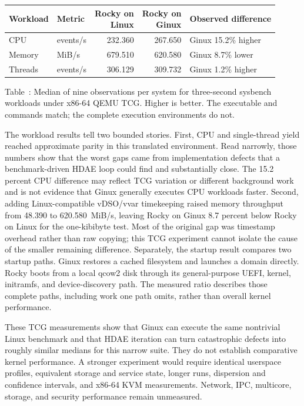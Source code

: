 \documentclass[11pt]{article}
\begin{document}
\begin{center}
\label{tab:sysbench-checkpoint}
\centering
\small
\begin{tabular}{@{}llrrl@{}}
\toprule
Workload & Metric & \shortstack{Rocky on\\Linux} & \shortstack{Rocky on\\Ginux} & Observed difference \\
\midrule
CPU & events/s & 232.360 & 267.650 & Ginux 15.2\% higher \\
Memory & MiB/s & 679.510 & 620.580 & Ginux 8.7\% lower \\
Threads & events/s & 306.129 & 309.732 & Ginux 1.2\% higher \\
\bottomrule
\end{tabular}
\par\medskip
Table~\thetable: Median of nine observations per system for three-second
sysbench workloads under x86-64 QEMU TCG. Higher is better. The executable and
commands match; the complete execution environments do not.
\end{center}
\medskip

The workload results tell two bounded stories. First, CPU and single-thread
yield reached approximate parity in this translated environment. Read narrowly,
those numbers show that the worst gaps came from implementation defects that a
benchmark-driven HDAE loop could find and substantially close. The 15.2 percent
CPU difference may reflect TCG variation or different background work and is
not evidence that Ginux generally executes CPU workloads faster. Second, adding Linux-compatible
vDSO/vvar timekeeping raised memory throughput from 48.390 to 620.580~MiB/s,
leaving Rocky on Ginux 8.7 percent below Rocky on Linux for the
one-kibibyte test. Most of the original gap was timestamp overhead rather than
raw copying; this TCG experiment cannot isolate the cause of the smaller
remaining difference. Separately, the startup result compares two startup paths.
Ginux restores a cached filesystem and launches a domain directly. Rocky boots
from a local qcow2 disk through its general-purpose UEFI, kernel, initramfs,
and device-discovery path. The measured ratio describes those complete paths,
including work one path omits, rather than overall kernel performance.

These TCG measurements show that Ginux can execute the same nontrivial Linux
benchmark and that HDAE iteration can turn catastrophic defects into roughly
similar medians for this narrow suite. They do not establish comparative kernel
performance. A stronger experiment would require identical userspace profiles,
equivalent storage and service state, longer runs, dispersion and confidence
intervals, and x86-64 KVM measurements. Network, IPC, multicore, storage, and
security performance remain unmeasured.
\end{document}
